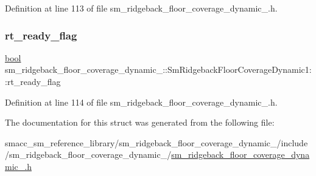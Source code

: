 Definition at line 113 of file sm\+\_\+ridgeback\+\_\+floor\+\_\+coverage\+\_\+dynamic\+\_.\+h.

\mbox{\label{structsm__ridgeback__floor__coverage__dynamic__1_1_1SmRidgebackFloorCoverageDynamic1_aa54392c38d6cbe8a6637f94a85293949}} 
\subsubsection{\texorpdfstring{rt\+\_\+ready\+\_\+flag}{rt\_ready\_flag}}
{\footnotesize\ttfamily \hyperlink{classbool}{bool} sm\+\_\+ridgeback\+\_\+floor\+\_\+coverage\+\_\+dynamic\+\_\+::\+Sm\+Ridgeback\+Floor\+Coverage\+Dynamic1\+::rt\+\_\+ready\+\_\+flag}



Definition at line 114 of file sm\+\_\+ridgeback\+\_\+floor\+\_\+coverage\+\_\+dynamic\+\_.\+h.



The documentation for this struct was generated from the following file\+:\begin{DoxyCompactItemize}
\item 
smacc\+\_\+sm\+\_\+reference\+\_\+library/sm\+\_\+ridgeback\+\_\+floor\+\_\+coverage\+\_\+dynamic\+\_/include/sm\+\_\+ridgeback\+\_\+floor\+\_\+coverage\+\_\+dynamic\+\_/\hyperlink{sm__ridgeback__floor__coverage__dynamic__1_8h}{sm\+\_\+ridgeback\+\_\+floor\+\_\+coverage\+\_\+dynamic\+\_.\+h}\end{DoxyCompactItemize}
